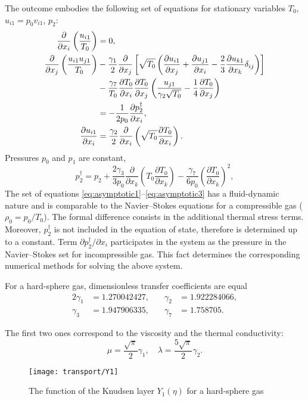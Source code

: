 \documentclass[english,a4paper,10pt]{article}
\newcommand{\pder}[2][]{\frac{\partial#1}{\partial#2}}
\begin{document}
The outcome embodies the following set of equations for stationary variables \(T_0\), \(u_{i1} = p_0v_{i1}\), \(p_2\):
\begin{align}
	\pder{x_i}\left(\frac{u_{i1}}{T_0}\right) &= 0, \label{eq:asymptotic1} \\
	\pder{x_j}\left(\frac{u_{i1}u_{j1}}{T_0}\right)
		&-\frac{\gamma_1}2\pder{x_j}\left[\sqrt{T_0}\left(
			\pder[u_{i1}]{x_j}+\pder[u_{j1}]{x_i}-\frac23\pder[u_{k1}]{x_k}\delta_{ij}\right
		)\right] \notag\\
		&- \frac{\gamma_7}{T_0}\pder[T_0]{x_i}\pder[T_0]{x_j}\left(\frac{u_{j1}}{\gamma_2\sqrt{T_0}} - \frac{1}4\pder[T_0]{x_j}\right) \notag\\
		&= -\frac1{2p_0}\pder[p_2^\dag]{x_i}, \label{eq:asymptotic2} \\
	\pder[u_{i1}]{x_i} &= \frac{\gamma_2}2\pder{x_i}\left(\sqrt{T_0}\pder[T_0]{x_i}\right). \label{eq:asymptotic3}
\end{align}
Pressures \(p_0\) and \(p_1\) are constant,
\[ 
	p_2^\dag = p_2 + 
		\frac{2\gamma_3}{3p_0}\pder{x_k}\left(T_0\pder[T_0]{x_k}\right) -
		\frac{\gamma_7}{6p_0}\left(\pder[T_0]{x_k}\right)^2,
\]
The set of equations \eqref{eq:asymptotic1}--\eqref{eq:asymptotic3} has a fluid-dynamic nature
and is comparable to the Navier--Stokes equations for a compressible gas (\(\rho_0 = p_0/T_0\)).
The formal difference consists in the additional thermal stress terms.
Moreover, \(p_2^\dag\) is not included in the equation of state, therefore is determined up to a constant.
Term \(\partial{p_2 ^ \dag} / \partial{x_i}\) participates in the system as the pressure
in the Navier--Stokes set for incompressible gas.
This fact determines the corresponding numerical methods for solving the above system.

For a hard-sphere gas, dimensionless transfer coefficients are equal
\begin{alignat*}{2}
	\gamma_1 &= 1.270042427, &\quad \gamma_2 &= 1.922284066, \\
	\gamma_3 &= 1.947906335, &\quad \gamma_7 &= 1.758705.
\end{alignat*}

The first two ones correspond to the viscosity and the thermal conductivity:
\[ \mu = \frac{\sqrt\pi}2\gamma_1, \quad \lambda = \frac{5\sqrt\pi}2\gamma_2. \]

\begin{wrapfigure}{r}{6.5cm}
	\vspace{-10pt}
	\texttt{[image: transport/Y1]}
	\vspace{-20pt}
	\caption{The function of the Knudsen layer \(Y_1(\eta)\) for a hard-sphere gas}\label{fig:Y1}
	\vspace{5pt}
\end{wrapfigure}
\end{document}
